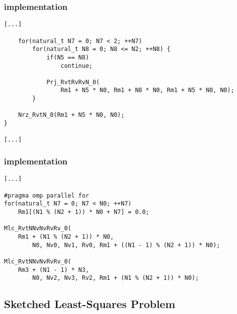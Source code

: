 \begin{frame}[fragile] %
    \frametitle{implementation}

\begin{lstlisting}[style=cpp]
    [...]

    for(natural_t N7 = 0; N7 < 2; ++N7)
        for(natural_t N8 = 0; N8 <= N2; ++N8) {
            if(N5 == N8)
                continue;

            Prj_RvtRvRvN_0(
                Rm1 + N5 * N0, Rm1 + N8 * N0, Rm1 + N5 * N0, N0);
        }

    Nrz_RvtN_0(Rm1 + N5 * N0, N0);
}

[...]
\end{lstlisting}

\end{frame}

\begin{frame}[fragile] %
    \frametitle{implementation}

\begin{lstlisting}[style=cpp]
[...]

#pragma omp parallel for
for(natural_t N7 = 0; N7 < N0; ++N7)
    Rm1[(N1 % (N2 + 1)) * N0 + N7] = 0.0;

Mlc_RvtNNvNvRvRv_0(
    Rm1 + (N1 % (N2 + 1)) * N0,
        N0, Nv0, Nv1, Rv0, Rm1 + ((N1 - 1) % (N2 + 1)) * N0);

Mlc_RvtNNvNvRvRv_0(
    Rm3 + (N1 - 1) * N3,
        N0, Nv2, Nv3, Rv2, Rm1 + (N1 % (N2 + 1)) * N0);
\end{lstlisting}

\end{frame}

\subsection{Sketched Least-Squares Problem}

